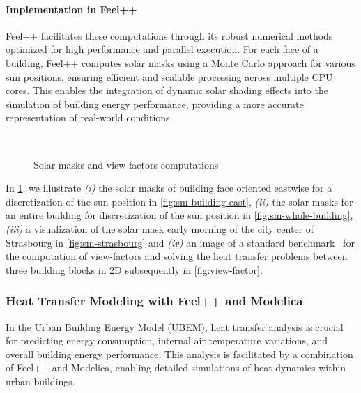\documentclass[runningheads]{llncs}
\begin{document}
\paragraph{Implementation in Feel++}
Feel++ facilitates these computations through its robust numerical methods optimized for high performance and parallel execution. For each face of a building, Feel++ computes solar masks using a Monte Carlo approach for various sun positions, ensuring efficient and scalable processing across multiple CPU cores. This enables the integration of dynamic solar shading effects into the simulation of building energy performance, providing a more accurate representation of real-world conditions.

\begin{figure}[ht]
\centering
{}
\hfill
{}\\
\hfill
{}
\caption{Solar masks and view factors computations}
\label{fig:solar-masks-vf}
\end{figure}

In \cref{fig:solar-masks-vf}, we illustrate \textit{(i)} the solar masks of building face oriented eastwise for a discretization of the sun position in \cref{fig:sm-building-east}, \textit{(ii)} the solar masks for an entire building for discretization of the sun position in \cref{fig:sm-whole-building}, \textit{(iii)} a visualization of the solar mask early morning of the city center of Strasbourg in \cref{fig:sm-strasbourg} and \textit{(iv)} an image of a standard benchmark~\cite{van_eck_surface_2016} for the computation of view-factors and solving the heat transfer problems between three building blocks in 2D subsequently in \cref{fig:view-factor}.

\subsubsection{Heat Transfer Modeling with Feel++ and Modelica}
In the Urban Building Energy Model (UBEM), heat transfer analysis is crucial for predicting energy consumption, internal air temperature variations, and overall building energy performance. This analysis is facilitated by a combination of Feel++ and Modelica, enabling detailed simulations of heat dynamics within urban buildings.
\end{document}

